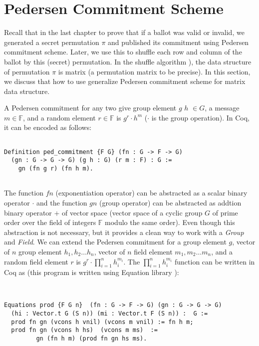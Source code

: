 \section{Pedersen Commitment Scheme}
\label{sec:pedersen}
Recall that in the last chapter to prove that if a ballot was valid or invalid, we generated a secret permutation $\pi$ and published its commitment using 
Pedersen commitment scheme. Later, we use this to shuffle each row and column of the ballot by this (secret) permutation. 
In the shuffle algorithm \citep{Wikstrom:2009:CPS}), the data structure of permutation $\pi$ is matrix (a permutation matrix to be precise).
In this section, we discuss that how to use generalize Pedersen commitment scheme for matrix data structure. 

A Pedersen commitment for any two give group element $g$ $h$ $\in G$, a message $m \in \mathbb{F}$, and a random element 
$r \in \mathbb{F}$ is $g^r \cdot h^m$ ($\cdot$ is the group operation). In Coq, it can be encoded as follows:  


\begin{verbatim}

Definition ped_commitment {F G} (fn : G -> F -> G) 
  (gn : G -> G -> G) (g h : G) (r m : F) : G := 
    gn (fn g r) (fn h m).


\end{verbatim}

\noindent
The function $fn$ (exponentiation operator) can be abstracted as a  scalar binary operator $\cdot$ and the 
function $gn$ (group operator) can be 
abstracted as addtion binary operator $+$ of vector space (vector space of a cyclic group $G$ of prime 
order over the field of integers $\mathbb{F}$ modulo the same order).  
Even though this abstraction is not necessary, but it 
provides a clean way to work with a \textit{Group} and \textit{Field}. 
We can extend the Pedersen commitment for a group element $g$, 
vector of $n$ group element $h_{1}, h_{2} \dots h_{n}$, vector of $n$ 
field element $m_{1}, m_{2} \dots m_{n}$, and a random field element 
$r$ is $g^r \cdot \prod_{i = 1}^n  h_{i}^{m_{i}}$. 
The $\prod_{i = 1}^n  h_{i}^{m_{i}}$ function can be written in Coq as 
(this program is written using Equation library \citep{Sozeau:2019:ERH:3352468.3341690}):

\begin{verbatim}


Equations prod {F G n}  (fn : G -> F -> G) (gn : G -> G -> G)
  (hi : Vector.t G (S n)) (mi : Vector.t F (S n)) :  G :=
  prod fn gn (vcons h vnil) (vcons m vnil) := fn h m;
  prod fn gn (vcons h hs)  (vcons m ms)  := 
         gn (fn h m) (prod fn gn hs ms).


\end{verbatim}


